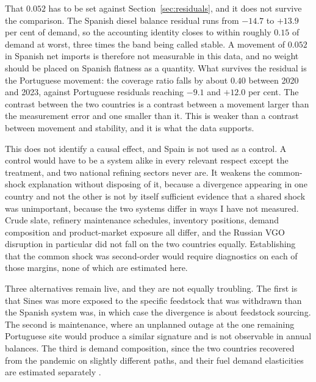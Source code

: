 \documentclass[11pt,a4paper]{article}
\begin{document}
That $0.052$ has to be set against Section~\ref{sec:residuals}, and it does not survive the
comparison. The Spanish diesel balance residual runs from $-14.7$ to $+13.9$ per cent of demand,
so the accounting identity closes to within roughly $0.15$ of demand at worst, three times the
band being called stable. A movement of $0.052$ in Spanish net imports is therefore not
measurable in this data, and no weight should be placed on Spanish flatness as a quantity. What
survives the residual is the Portuguese movement: the coverage ratio falls by about $0.40$
between 2020 and 2023, against Portuguese residuals reaching $-9.1$ and $+12.0$ per cent. The
contrast between the two countries is a contrast between a movement larger than the measurement
error and one smaller than it. This is weaker than a contrast between movement and stability,
and it is what the data supports.

This does not identify a causal effect, and Spain is not used as a control. A control would have
to be a system alike in every relevant respect except the treatment, and two national refining
sectors never are. It weakens the common-shock explanation without disposing of it, because a
divergence appearing in one country and not the other is not by itself sufficient evidence that
a shared shock was unimportant, because the two systems differ in ways I have not measured.
Crude slate, refinery maintenance schedules, inventory positions, demand composition and
product-market exposure all differ, and the Russian VGO disruption in particular did not fall on
the two countries equally. Establishing that the common shock was second-order would require
diagnostics on each of those margins, none of which are estimated here.

Three alternatives remain live, and they are not equally troubling. The first is that Sines was
more exposed to the specific feedstock that was withdrawn than the Spanish system was, in which
case the divergence is about feedstock sourcing. The second is maintenance, where an unplanned
outage at the one remaining Portuguese site would produce a similar signature and is not
observable in annual balances. The third is demand composition, since the two countries
recovered from the pandemic on slightly different paths, and their fuel demand elasticities are
estimated separately \citep{bakhat2017elasticities}.
\end{document}
